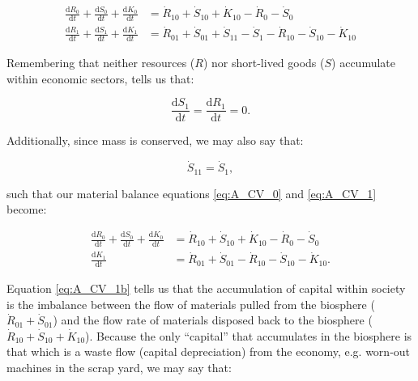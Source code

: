 \begin{align}
\label{eq:A_CV_0}
	\frac{\mathrm{d}R_0}{\mathrm{d}t}		
	+	\frac{\mathrm{d}S_0}{\mathrm{d}t}
	+	\frac{\mathrm{d}K_0}{\mathrm{d}t}		&	
	=	\dot{R}_{10}		
	+	\dot{S}_{10}	
	+	\dot{K}_{10}											
	-	\dot{R}_{0}											
	-	\dot{S}_{0}								\\
\label{eq:A_CV_1}
	\frac{\mathrm{d}R_{1}}{\mathrm{d}t}
	+ \frac{\mathrm{d}S_{1}}{\mathrm{d}t}
	+ \frac{\mathrm{d}K_{1}}{\mathrm{d}t}		&
	= \dot{R}_{01} 
	+ \dot{S}_{01} + \dot{S}_{11}
	- \dot{S}_{1}				
	- \dot{R}_{10}				
	- \dot{S}_{10}				
	- \dot{K}_{10}											
\end{align}

\noindent Remembering that neither resources ($R$) nor short-lived goods ($S$) accumulate within economic sectors, tells us that:

\begin{equation}\label{eq:A-dS_1/dt_zero}
	\frac{\mathrm{d}S_1}{\mathrm{d}t}
	= \frac{\mathrm{d}R_1}{\mathrm{d}t}
	= 0.
\end{equation}

\noindent Additionally, since mass is conserved, we may also say that:

\begin{equation}\label{eq:A_S11}
	\dot{S}_{11} = \dot{S}_{1},
\end{equation}

\noindent such that our material balance equations \ref{eq:A_CV_0} and \ref{eq:A_CV_1} 
become:


\begin{align}\label{eq:A_CV_0b}
	\frac{\mathrm{d}R_0}{\mathrm{d}t}		
	+	\frac{\mathrm{d}S_0}{\mathrm{d}t}
	+	\frac{\mathrm{d}K_0}{\mathrm{d}t}		&	
	=	\dot{R}_{10}		
	+	\dot{S}_{10}	
	+	\dot{K}_{10}											
	-	\dot{R}_{0}											
	-	\dot{S}_{0}								\\
	\label{eq:A_CV_1b}
	\frac{\mathrm{d}K_{1}}{\mathrm{d}t}		&
	= \dot{R}_{01} 
	+ \dot{S}_{01} 
	- \dot{R}_{10}				
	- \dot{S}_{10}				
	- \dot{K}_{10}.										
\end{align}

Equation \ref{eq:A_CV_1b} tells us that the accumulation of capital within society is the imbalance 
between the flow of materials pulled from the biosphere ($\dot{R}_{01} + \dot{S}_{01}$) and the 
flow rate of materials disposed back to the biosphere ($\dot{R}_{10} + \dot{S}_{10} + \dot{K}_{10}$). 
Because the only ``capital'' that accumulates in the biosphere is that which is a waste flow (capital depreciation)
from the economy, e.g. worn-out machines in the scrap yard, we may say that:

